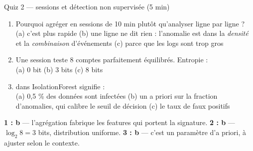 \begin{frame}{Quiz 2 --- sessions et détection non supervisée (5 min)}
\begin{qbox}[3 questions]
\begin{enumerate}
\item Pourquoi agréger en sessions de 10 min plutôt qu'analyser ligne par ligne ?\\
(a) c'est plus rapide \quad (b) une ligne ne dit rien : l'anomalie est dans la
\emph{densité} et la \emph{combinaison} d'événements \quad (c) parce que les
logs sont trop gros
\item Une session teste 8 comptes parfaitement équilibrés. Entropie :\\
(a) 0 bit \quad (b) 3 bits \quad (c) 8 bits
\item {} dans IsolationForest signifie :\\
(a) 0,5 \% des données sont infectées \quad (b) un a priori sur la fraction
d'anomalies, qui calibre le seuil de décision \quad (c) le taux de faux positifs
\end{enumerate}
\end{qbox}
\vspace{1mm}
\begin{solbox}[Réponses]
\textbf{1 : b} --- l'agrégation fabrique les features qui portent la signature.
\quad
\textbf{2 : b} --- $\log_2 8 = 3$ bits, distribution uniforme.
\quad
\textbf{3 : b} --- c'est un paramètre d'a priori, à ajuster selon le contexte.
\end{solbox}
\end{frame}
